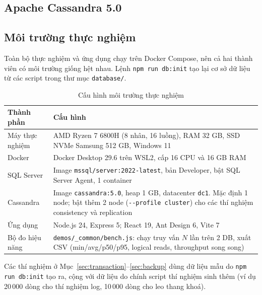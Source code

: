 \subsection{Apache Cassandra 5.0}

\subsection{Môi trường thực nghiệm}
Toàn bộ thực nghiệm và ứng dụng chạy trên Docker Compose, nên cả hai thành viên có môi trường giống hệt nhau. Lệnh \texttt{npm run db:init} tạo lại cơ sở dữ liệu từ các script trong thư mục \texttt{database/}.

\begin{table}[H]
\centering
\caption{Cấu hình môi trường thực nghiệm}
\label{tab:env}
\begin{tabularx}{\linewidth}{|p{3.5cm}|X|}
\hline
\textbf{Thành phần} & \textbf{Cấu hình} \\ \hline
Máy thực nghiệm & AMD Ryzen 7 6800H (8 nhân, 16 luồng), RAM 32 GB, SSD NVMe Samsung 512 GB, Windows 11 \\ \hline
Docker & Docker Desktop 29.6 trên WSL2, cấp 16 CPU và 16 GB RAM \\ \hline
SQL Server & Image \texttt{mssql/server:2022-latest}, bản Developer, bật SQL Server Agent, 1 container \\ \hline
Cassandra & Image \texttt{cassandra:5.0}, heap 1 GB, datacenter \texttt{dc1}. Mặc định 1 node; bật thêm 2 node (\texttt{-{}-profile cluster}) cho các thí nghiệm consistency và replication \\ \hline
Ứng dụng & Node.js 24, Express 5; React 19, Ant Design 6, Vite 7 \\ \hline
Bộ đo hiệu năng & \texttt{demos/\_common/bench.js}: chạy truy vấn $N$ lần trên 2 DB, xuất CSV (min/avg/p50/p95, logical reads, throughput song song) \\ \hline
\end{tabularx}
\end{table}

Các thí nghiệm ở Mục~\ref{sec:transaction}--\ref{sec:backup} dùng dữ liệu mẫu do \texttt{npm run db:init} tạo ra, cộng với dữ liệu do chính script thí nghiệm sinh thêm (ví dụ 20\,000 dòng cho thí nghiệm log, 10\,000 dòng cho leo thang khoá).

